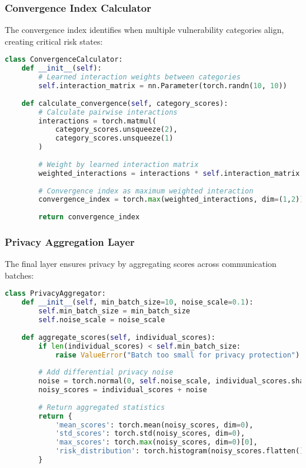 \documentclass[11pt,a4paper]{article}
\begin{document}
\subsubsection{Convergence Index Calculator}

The convergence index identifies when multiple vulnerability categories align, creating critical risk states:

\begin{lstlisting}[language=Python, caption=Convergence Index Calculation]
class ConvergenceCalculator:
    def __init__(self):
        # Learned interaction weights between categories
        self.interaction_matrix = nn.Parameter(torch.randn(10, 10))
        
    def calculate_convergence(self, category_scores):
        # Calculate pairwise interactions
        interactions = torch.matmul(
            category_scores.unsqueeze(2), 
            category_scores.unsqueeze(1)
        )
        
        # Weight by learned interaction matrix
        weighted_interactions = interactions * self.interaction_matrix
        
        # Convergence index as maximum weighted interaction
        convergence_index = torch.max(weighted_interactions, dim=(1,2))[0]
        
        return convergence_index
\end{lstlisting}

\subsubsection{Privacy Aggregation Layer}

The final layer ensures privacy by aggregating scores across communication batches:

\begin{lstlisting}[language=Python, caption=Privacy Aggregation]
class PrivacyAggregator:
    def __init__(self, min_batch_size=10, noise_scale=0.1):
        self.min_batch_size = min_batch_size
        self.noise_scale = noise_scale
        
    def aggregate_scores(self, individual_scores):
        if len(individual_scores) < self.min_batch_size:
            raise ValueError("Batch too small for privacy protection")
            
        # Add differential privacy noise
        noise = torch.normal(0, self.noise_scale, individual_scores.shape)
        noisy_scores = individual_scores + noise
        
        # Return aggregated statistics
        return {
            'mean_scores': torch.mean(noisy_scores, dim=0),
            'std_scores': torch.std(noisy_scores, dim=0),
            'max_scores': torch.max(noisy_scores, dim=0)[0],
            'risk_distribution': torch.histogram(noisy_scores.flatten(), bins=10)
        }
\end{lstlisting}
\end{document}
